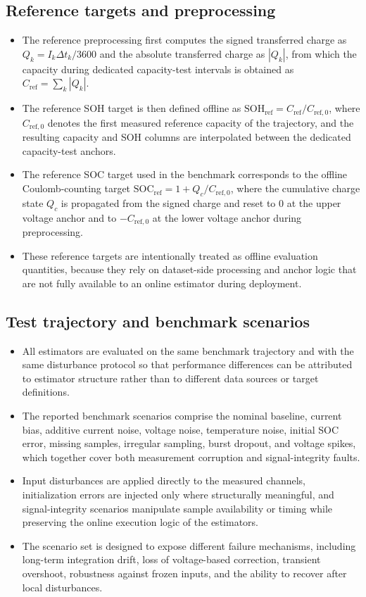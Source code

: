 \documentclass[review,nopreprintline]{elsarticle}
\begin{document}
\subsection{Reference targets and preprocessing}
\begin{itemize}[leftmargin=*]
    \item The reference preprocessing first computes the signed transferred charge as $Q_k = I_k \Delta t_k / 3600$ and the absolute transferred charge as $|Q_k|$, from which the capacity during dedicated capacity-test intervals is obtained as $C_{\mathrm{ref}} = \sum_k |Q_k|$.
    \item The reference SOH target is then defined offline as $\mathrm{SOH}_{\mathrm{ref}} = C_{\mathrm{ref}} / C_{\mathrm{ref},0}$, where $C_{\mathrm{ref},0}$ denotes the first measured reference capacity of the trajectory, and the resulting capacity and SOH columns are interpolated between the dedicated capacity-test anchors.
    \item The reference SOC target used in the benchmark corresponds to the offline Coulomb-counting target $\mathrm{SOC}_{\mathrm{ref}} = 1 + Q_c / C_{\mathrm{ref},0}$, where the cumulative charge state $Q_c$ is propagated from the signed charge and reset to $0$ at the upper voltage anchor and to $-C_{\mathrm{ref},0}$ at the lower voltage anchor during preprocessing.
    \item These reference targets are intentionally treated as offline evaluation quantities, because they rely on dataset-side processing and anchor logic that are not fully available to an online estimator during deployment.
\end{itemize}

\subsection{Test trajectory and benchmark scenarios}
\begin{itemize}[leftmargin=*]
    \item All estimators are evaluated on the same benchmark trajectory and with the same disturbance protocol so that performance differences can be attributed to estimator structure rather than to different data sources or target definitions.
    \item The reported benchmark scenarios comprise the nominal baseline, current bias, additive current noise, voltage noise, temperature noise, initial SOC error, missing samples, irregular sampling, burst dropout, and voltage spikes, which together cover both measurement corruption and signal-integrity faults.
    \item Input disturbances are applied directly to the measured channels, initialization errors are injected only where structurally meaningful, and signal-integrity scenarios manipulate sample availability or timing while preserving the online execution logic of the estimators.
    \item The scenario set is designed to expose different failure mechanisms, including long-term integration drift, loss of voltage-based correction, transient overshoot, robustness against frozen inputs, and the ability to recover after local disturbances.
\end{itemize}
\end{document}
